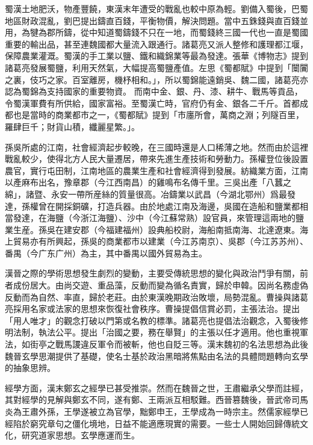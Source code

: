 蜀漢土地肥沃，物產豐饒，東漢末年遭受的戰亂也較中原為輕。劉備入蜀後，巴蜀地區財政混亂，劉巴提出鑄直百錢，平衡物價，解決問題。當中五銖錢與直百錢並用，為犍為郡所鑄，從中知道蜀鑄錢不只在一地，而蜀錢終三國一代也一直是蜀國重要的輸出品，甚至連魏國都大量流入跟通行。諸葛亮又派人整修和護理都江堰，保障農業灌溉。蜀漢的手工業以鹽、鐵和織錦業等最為發達。張華《博物志》提到諸葛亮發展蜀鹽，利用天然氣，大幅提高蜀鹽產值。左思《蜀都賦》中提到「闤闠之裏，伎巧之家。百室離房，機杼相和。」，所以蜀錦能遠銷吳、魏二國，諸葛亮亦認為蜀錦為支持國家的重要物資。 而南中金、銀、丹、漆、耕牛、戰馬等貢品，令蜀漢軍費有所供給，國家富裕。至蜀漢亡時，官府仍有金、銀各二千斤。首都成都也是當時的商業都市之一，《蜀都賦》提到「市廛所會，萬商之淵；列隧百里，羅肆巨千；財貨山積，纖麗星繁。」。

孫吳所處的江南，社會經濟起步較晚，在三國時還是人口稀薄之地。然而由於這裡戰亂較少，使得北方人民大量遷居，帶來先進生產技術和勞動力。孫權登位後設置農官，實行屯田制，江南地區的農業生產和社會經濟得到發展。紡織業方面，江南以產麻布出名，豫章郡（今江西南昌）的雞鳴布名傳千里。三吳出產「八蠶之綿」，諸暨、永安一帶所産絲的質量很高。冶鑄業以武昌（今湖北鄂州）爲最發達，孫權曾在開採銅礦，打造兵器。由於地處江南及海邊，吳國在造船和鹽業都相當發達，在海鹽（今浙江海鹽）、沙中（今江蘇常熟）設官員，來管理這兩地的鹽業生産。孫吳在建安郡（今福建福州）設典船校尉，海船南抵南海、北達遼東。海上貿易亦有所興起，孫吳的商業都市以建業（今江苏南京）、吳郡（今江苏苏州）、番禺（今广东广州）為主，其中番禺以國外貿易為主。

漢晉之際的學術思想發生劇烈的變動，主要受傳統思想的變化與政治鬥爭有關，前者成份居大。由尚交遊、重品藻，反動而變為循名責實，歸於申韓。因尚名務虛偽反動而為自然、率直，歸於老莊。由於東漢晚期政治敗壞，局勢混亂。曹操與諸葛亮採用名家或法家的思想來恢復社會秩序。曹操提倡信賞必罰，主張法治。提出「用人唯才」的觀念打破以門第或名教的標準。諸葛亮也提倡法治觀念，入蜀後修明法制，執法公平。提出「治國之要，務在舉賢」的主張以任才適用。他也重視軍法，如街亭之戰馬謖違反軍令而被斬，他也自貶三等。漢末魏初的名法思想為此後魏晉玄學思潮提供了基礎，使名士基於政治黑暗將焦點由名法的具體問題轉向玄學的抽象思辨。

經學方面，漢末鄭玄之經學已甚受推崇。然而在魏晉之世，王肅繼承父學而註經，其對經學的見解與鄭玄不同，遂有鄭、王兩派互相駁難。西晉篡魏後，晉武帝司馬炎為王肅外孫，王學遂被立為官學，黜鄭申王，王學成為一時宗主。然儒家經學已經陷於窮究章句之僵化境地，日益不能適應現實的需要。一些士人開始回歸傳統文化，研究道家思想。玄學應運而生。

